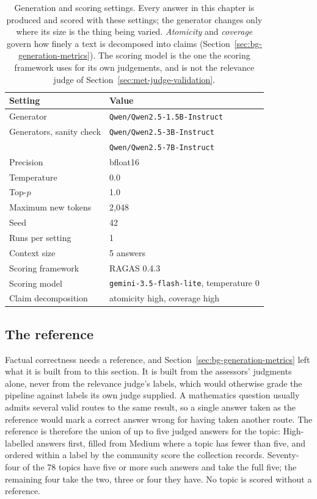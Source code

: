 \begin{table}[t]
\centering
\begin{tabular}{ll}
\toprule
Setting & Value \\
\midrule
Generator                & \texttt{Qwen/Qwen2.5-1.5B-Instruct} \\
Generators, sanity check & \texttt{Qwen/Qwen2.5-3B-Instruct} \\
                         & \texttt{Qwen/Qwen2.5-7B-Instruct} \\
Precision                & bfloat16 \\
Temperature              & 0.0 \\
Top-$p$                  & 1.0 \\
Maximum new tokens       & 2{,}048 \\
Seed                     & 42 \\
Runs per setting         & 1 \\
Context size             & 5 answers \\
\addlinespace
Scoring framework        & RAGAS 0.4.3 \\
Scoring model            & \texttt{gemini-3.5-flash-lite}, temperature 0 \\
Claim decomposition      & atomicity high, coverage high \\
\bottomrule
\end{tabular}
\caption[Generation and scoring settings]{Generation and scoring settings. Every answer in this
chapter is produced and scored with these settings; the generator changes only where its size is the
thing being varied. \emph{Atomicity} and \emph{coverage} govern how finely a text is decomposed into
claims (Section~\ref{sec:bg-generation-metrics}). The scoring model is the one the scoring framework
uses for its own judgements, and is not the relevance judge of
Section~\ref{sec:met-judge-validation}.}
\label{tab:gen-settings}
\end{table}

\subsection*{The reference}

Factual correctness needs a reference, and Section~\ref{sec:bg-generation-metrics} left what it is
built from to this section. It is built from the assessors' judgments alone, never from the relevance
judge's labels, which would otherwise grade the pipeline against labels its own judge supplied. A
mathematics question usually admits several valid routes to the same result, so a single answer taken
as the reference would mark a correct answer wrong for having taken another route. The reference is
therefore the union of up to five judged answers for the topic: High-labelled answers first, filled
from Medium where a topic has fewer than five, and ordered within a label by the community score the
collection records. Seventy-four of the 78 topics have five or more such answers and take the full
five; the remaining four take the two, three or four they have. No topic is scored without a
reference.

